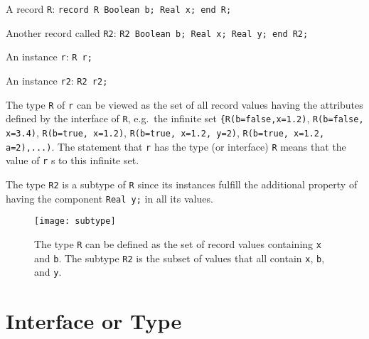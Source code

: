 \begin{example}
A record \lstinline!R!: \lstinline!record R Boolean b; Real x; end R;!

Another record called \lstinline!R2!: \lstinline!R2 Boolean b; Real x; Real y; end R2;!

An instance \lstinline!r!: \lstinline!R r;!

An instance \lstinline!r2!: \lstinline!R2 r2;!

The type \lstinline!R! of \lstinline!r! can be viewed as the set of all
record values having the attributes defined by the interface of
\lstinline!R!, e.g.\ the infinite set \lstinline!{R(b=false,x=1.2)!, \lstinline!R(b=false, x=3.4)!,
\lstinline!R(b=true, x=1.2)!, \lstinline!R(b=true, x=1.2, y=2)!,
\lstinline!R(b=true, x=1.2, a=2),...)!. The statement that \lstinline!r! has the type (or
interface) \lstinline!R! means that the value of \lstinline!r! s to this
infinite set.

The type \lstinline!R2! is a subtype of \lstinline!R! since its instances
fulfill the additional property of having the component \lstinline!Real y;!
in all its values.

\begin{figure}[H]
\caption{The type \lstinline!R! can be defined as the set of
record values containing \lstinline!x! and \lstinline!b!. The subtype \lstinline!R2! is the subset of values
that all contain \lstinline!x!, \lstinline!b!, and \lstinline!y!.}
\texttt{[image: subtype]}
\end{figure}
\end{example}

\section{Interface or Type}


